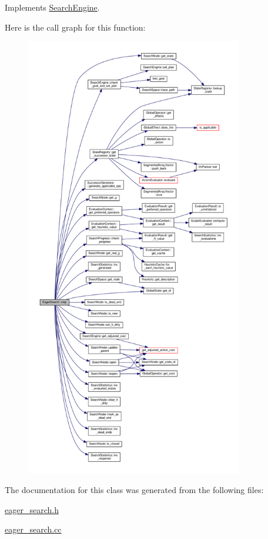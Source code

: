 Implements \hyperlink{classSearchEngine_a2c003ac4636fd1442fd2d4eb8db5ab8d}{Search\-Engine}.



Here is the call graph for this function\-:
\nopagebreak
\begin{figure}[H]
\begin{center}
\leavevmode
\includegraphics[height=550pt]{classEagerSearch_a579812c68f5321a6eb9e6fe0da59e14c_cgraph}
\end{center}
\end{figure}




The documentation for this class was generated from the following files\-:\begin{DoxyCompactItemize}
\item 
\hyperlink{eager__search_8h}{eager\-\_\-search.\-h}\item 
\hyperlink{eager__search_8cc}{eager\-\_\-search.\-cc}\end{DoxyCompactItemize}
